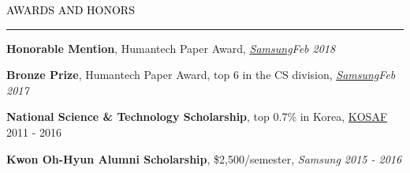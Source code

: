 \documentclass{resume} %
\renewenvironment{rSection}[1]{
	\sectionskip
	\textcolor{Black}{\MakeUppercase{#1}}
	\sectionlineskip
	\hrule
	\begin{list}{}{
			\setlength{\leftmargin}{1.5em}
		}
		\item[]
	}{
	\end{list}
}
\begin{document}

%	


\begin{rSection}{Awards and Honors}
	\vspace*{-2.5mm}
	\begin{rSubsection}{}{}{}{}
		\item \textbf{Honorable Mention}, Humantech Paper Award, \em{\href{https://humantech.samsung.com/saitext/index.jsp}{Samsung}}\em \hfill Feb 2018
		
		\item \textbf{Bronze Prize}, Humantech Paper Award, top 6 in the CS division, \em{\href{https://humantech.samsung.com/saitext/index.jsp}{Samsung}}\em \hfill Feb 2017
		
		\item \textbf{National Science \& Technology Scholarship}, top 0.7\% in Korea, \href{http://www.kosaf.go.kr/}{KOSAF} \hfill 2011 - 2016
		
		\item \textbf{Kwon Oh-Hyun Alumni Scholarship}, \$2,500/semester, \em Samsung \em \hfill 2015 - 2016
		
	\end{rSubsection}

\end{rSection}
\end{document}
